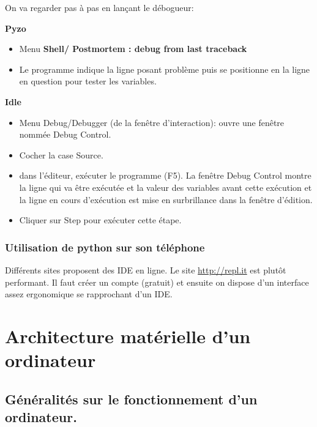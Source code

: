 On va regarder pas à pas en lançant le débogueur:
\begin{center}
\begin{minipage}[t]{0.45\textwidth}
\textbf{Pyzo}

\begin{itemize}
\item Menu \textbf{Shell/ Postmortem : debug from last traceback}

\item Le programme indique la ligne posant problème puis se positionne en la ligne en question pour tester les variables.
\end{itemize}
\end{minipage}
\vline
\begin{minipage}[t]{0.45\textwidth}
\textbf{Idle}

\begin{itemize}
\item Menu Debug/Debugger (de la fenêtre d'interaction): ouvre une fenêtre nommée
Debug Control. 
\item Cocher la case \og{}Source\fg{}.

\item dans l'éditeur, exécuter le programme (F5). La fenêtre Debug
Control montre la ligne qui va être exécutée et la valeur des
variables avant cette exécution et la ligne en cours d'exécution est
mise en surbrillance dans la fenêtre d'édition. 
\item Cliquer sur Step pour
exécuter cette étape.
\end{itemize}

\end{minipage}
\end{center}


\subsubsection{Utilisation de python sur son téléphone}

Différents sites proposent des IDE en ligne. Le site \url{http://repl.it} est plutôt performant. Il faut créer un compte (gratuit) et ensuite on dispose d'un interface assez ergonomique se rapprochant d'un IDE.




\section{Architecture matérielle d'un ordinateur}
\subsection{Généralités sur le fonctionnement d'un ordinateur.}\label{sec.ordi}

